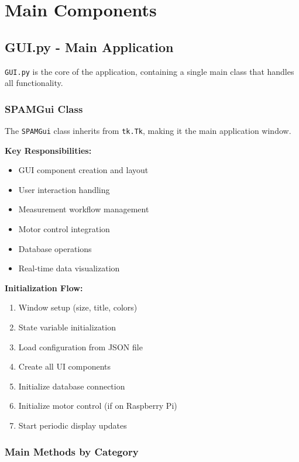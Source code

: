 \documentclass[11pt,a4paper]{article}
\begin{document}
\section{Main Components}

\subsection{GUI.py - Main Application}

\texttt{GUI.py} is the core of the application, containing a single main class that handles all functionality.

\subsubsection{SPAMGui Class}
The \texttt{SPAMGui} class inherits from \texttt{tk.Tk}, making it the main application window.

\textbf{Key Responsibilities:}
\begin{itemize}
    \item GUI component creation and layout
    \item User interaction handling
    \item Measurement workflow management
    \item Motor control integration
    \item Database operations
    \item Real-time data visualization
\end{itemize}

\textbf{Initialization Flow:}
\begin{enumerate}
    \item Window setup (size, title, colors)
    \item State variable initialization
    \item Load configuration from JSON file
    \item Create all UI components
    \item Initialize database connection
    \item Initialize motor control (if on Raspberry Pi)
    \item Start periodic display updates
\end{enumerate}

\subsubsection{Main Methods by Category}
\end{document}
